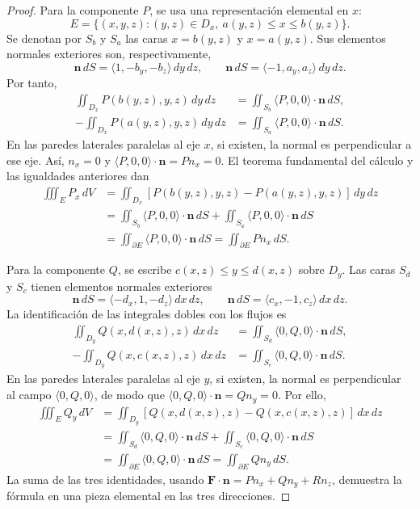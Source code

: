 \begin{proof}
Para la componente $P$, se usa una representación elemental en $x$:
\[
E=\{(x,y,z):(y,z)\in D_x,\ a(y,z)\leq x\leq b(y,z)\}.
\]
Se denotan por $S_b$ y $S_a$ las caras $x=b(y,z)$ y $x=a(y,z)$. Sus elementos normales exteriores son, respectivamente,
\[
\mathbf n\,dS=\langle1,-b_y,-b_z\rangle\,dy\,dz,
\qquad
\mathbf n\,dS=\langle-1,a_y,a_z\rangle\,dy\,dz.
\]
Por tanto,
\begin{align*}
\iint_{D_x}P(b(y,z),y,z)\,dy\,dz
&=\iint_{S_b}\langle P,0,0\rangle\cdot\mathbf n\,dS,\\
-\iint_{D_x}P(a(y,z),y,z)\,dy\,dz
&=\iint_{S_a}\langle P,0,0\rangle\cdot\mathbf n\,dS.
\end{align*}
En las paredes laterales paralelas al eje $x$, si existen, la normal es perpendicular a ese eje. Así, $n_x=0$ y $\langle P,0,0\rangle\cdot\mathbf n=P n_x=0$. El teorema fundamental del cálculo y las igualdades anteriores dan
\begin{align*}
\iiint_E P_x\,dV
&=\iint_{D_x}[P(b(y,z),y,z)-P(a(y,z),y,z)]\,dy\,dz\\
&=\iint_{S_b}\langle P,0,0\rangle\cdot\mathbf n\,dS
 +\iint_{S_a}\langle P,0,0\rangle\cdot\mathbf n\,dS\\
&=\iint_{\partial E}\langle P,0,0\rangle\cdot\mathbf n\,dS
=\iint_{\partial E}P n_x\,dS.
\end{align*}

Para la componente $Q$, se escribe $c(x,z)\leq y\leq d(x,z)$ sobre $D_y$. Las caras $S_d$ y $S_c$ tienen elementos normales exteriores
\[
\mathbf n\,dS=\langle-d_x,1,-d_z\rangle\,dx\,dz,
\qquad
\mathbf n\,dS=\langle c_x,-1,c_z\rangle\,dx\,dz.
\]
La identificación de las integrales dobles con los flujos es
\begin{align*}
\iint_{D_y}Q(x,d(x,z),z)\,dx\,dz
&=\iint_{S_d}\langle0,Q,0\rangle\cdot\mathbf n\,dS,\\
-\iint_{D_y}Q(x,c(x,z),z)\,dx\,dz
&=\iint_{S_c}\langle0,Q,0\rangle\cdot\mathbf n\,dS.
\end{align*}
En las paredes laterales paralelas al eje $y$, si existen, la normal es perpendicular al campo $\langle0,Q,0\rangle$, de modo que $\langle0,Q,0\rangle\cdot\mathbf n=Q n_y=0$. Por ello,
\begin{align*}
\iiint_E Q_y\,dV
&=\iint_{D_y}[Q(x,d(x,z),z)-Q(x,c(x,z),z)]\,dx\,dz\\
&=\iint_{S_d}\langle0,Q,0\rangle\cdot\mathbf n\,dS
 +\iint_{S_c}\langle0,Q,0\rangle\cdot\mathbf n\,dS\\
&=\iint_{\partial E}\langle0,Q,0\rangle\cdot\mathbf n\,dS
=\iint_{\partial E}Q n_y\,dS.
\end{align*}
La suma de las tres identidades, usando $\mathbf F\cdot\mathbf n=P n_x+Q n_y+R n_z$, demuestra la fórmula en una pieza elemental en las tres direcciones.


\end{proof}
